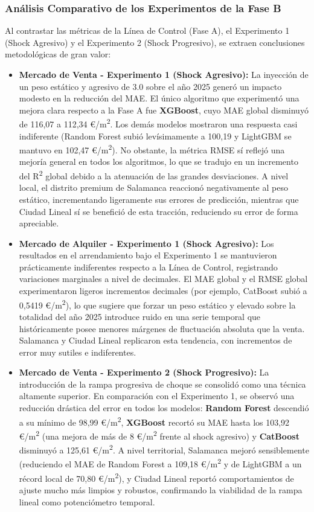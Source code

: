 \documentclass[a4paper,11pt,openany]{book}
\begin{document}
\subsubsection{Análisis Comparativo de los Experimentos de la Fase B}
Al contrastar las métricas de la Línea de Control (Fase A), el Experimento 1 (Shock Agresivo) y el Experimento 2 (Shock Progresivo), se extraen conclusiones metodológicas de gran valor:
\begin{itemize}
    \item \textbf{Mercado de Venta - Experimento 1 (Shock Agresivo):} La inyección de un peso estático y agresivo de 3.0 sobre el año 2025 generó un impacto modesto en la reducción del MAE. El único algoritmo que experimentó una mejora clara respecto a la Fase A fue \textbf{XGBoost}, cuyo MAE global disminuyó de 116,07 a 112,34 €/m\textsuperscript{2}. Los demás modelos mostraron una respuesta casi indiferente (Random Forest subió levísimamente a 100,19 y LightGBM se mantuvo en 102,47 €/m\textsuperscript{2}). No obstante, la métrica RMSE sí reflejó una mejoría general en todos los algoritmos, lo que se tradujo en un incremento del R\textsuperscript{2} global debido a la atenuación de las grandes desviaciones. A nivel local, el distrito premium de Salamanca reaccionó negativamente al peso estático, incrementando ligeramente sus errores de predicción, mientras que Ciudad Lineal sí se benefició de esta tracción, reduciendo su error de forma apreciable.
    \item \textbf{Mercado de Alquiler - Experimento 1 (Shock Agresivo):} Los resultados en el arrendamiento bajo el Experimento 1 se mantuvieron prácticamente indiferentes respecto a la Línea de Control, registrando variaciones marginales a nivel de decimales. El MAE global y el RMSE global experimentaron ligeros incrementos decimales (por ejemplo, CatBoost subió a 0,5419 €/m\textsuperscript{2}), lo que sugiere que forzar un peso estático y elevado sobre la totalidad del año 2025 introduce ruido en una serie temporal que históricamente posee menores márgenes de fluctuación absoluta que la venta. Salamanca y Ciudad Lineal replicaron esta tendencia, con incrementos de error muy sutiles e indiferentes.
    \item \textbf{Mercado de Venta - Experimento 2 (Shock Progresivo):} La introducción de la rampa progresiva de choque se consolidó como una técnica altamente superior. En comparación con el Experimento 1, se observó una reducción drástica del error en todos los modelos: \textbf{Random Forest} descendió a su mínimo de 98,99 €/m\textsuperscript{2}, \textbf{XGBoost} recortó su MAE hasta los 103,92 €/m\textsuperscript{2} (una mejora de más de 8 €/m\textsuperscript{2} frente al shock agresivo) y \textbf{CatBoost} disminuyó a 125,61 €/m\textsuperscript{2}. A nivel territorial, Salamanca mejoró sensiblemente (reduciendo el MAE de Random Forest a 109,18 €/m\textsuperscript{2} y de LightGBM a un récord local de 70,80 €/m\textsuperscript{2}), y Ciudad Lineal reportó comportamientos de ajuste mucho más limpios y robustos, confirmando la viabilidad de la rampa lineal como potenciómetro temporal.

\end{itemize}
\end{document}
